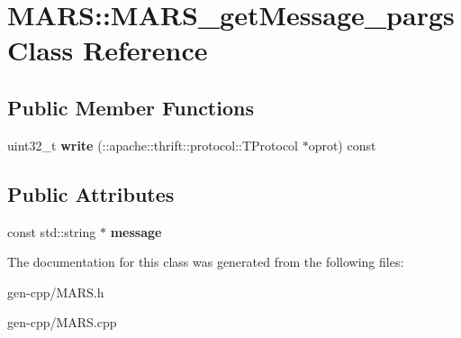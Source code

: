 \hypertarget{classMARS_1_1MARS__getMessage__pargs}{}\section{M\+A\+RS\+:\+:M\+A\+R\+S\+\_\+get\+Message\+\_\+pargs Class Reference}
\label{classMARS_1_1MARS__getMessage__pargs}
\subsection*{Public Member Functions}
\begin{DoxyCompactItemize}
\item 
\mbox{\label{classMARS_1_1MARS__getMessage__pargs_a50c8af87683ea01e4b83acbae21e3abc}} 
uint32\+\_\+t {\bfseries write} (\+::apache\+::thrift\+::protocol\+::\+T\+Protocol $\ast$oprot) const
\end{DoxyCompactItemize}
\subsection*{Public Attributes}
\begin{DoxyCompactItemize}
\item 
\mbox{\label{classMARS_1_1MARS__getMessage__pargs_a9091ee1ac246ca96ffefb704940b2408}} 
const std\+::string $\ast$ {\bfseries message}
\end{DoxyCompactItemize}


The documentation for this class was generated from the following files\+:\begin{DoxyCompactItemize}
\item 
gen-\/cpp/M\+A\+R\+S.\+h\item 
gen-\/cpp/M\+A\+R\+S.\+cpp\end{DoxyCompactItemize}
